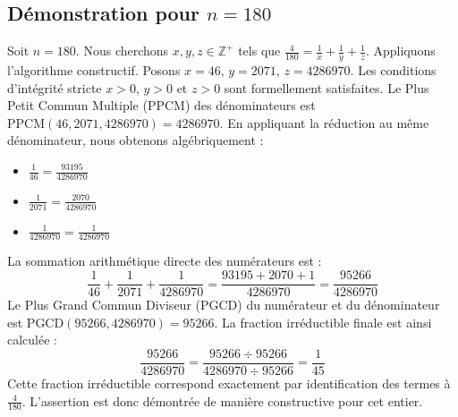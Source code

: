 \documentclass[11pt,a4paper]{article}
\begin{document}
\subsection{Démonstration pour $n = 180$}
Soit $n = 180$. Nous cherchons $x, y, z \in \mathbb{Z}^{+}$ tels que $\frac{4}{180} = \frac{1}{x} + \frac{1}{y} + \frac{1}{z}$.
Appliquons l'algorithme constructif. Posons $x = 46$, $y = 2071$, $z = 4286970$.
Les conditions d'intégrité stricte $x > 0$, $y > 0$ et $z > 0$ sont formellement satisfaites.
Le Plus Petit Commun Multiple (PPCM) des dénominateurs est $\text{PPCM}(46, 2071, 4286970) = 4286970$.
En appliquant la réduction au même dénominateur, nous obtenons algébriquement :
\begin{itemize}
    \item $\frac{1}{46} = \frac{93195}{4286970}$
    \item $\frac{1}{2071} = \frac{2070}{4286970}$
    \item $\frac{1}{4286970} = \frac{1}{4286970}$
\end{itemize}
La sommation arithmétique directe des numérateurs est :
$$ \frac{1}{46} + \frac{1}{2071} + \frac{1}{4286970} = \frac{93195 + 2070 + 1}{4286970} = \frac{95266}{4286970} $$
Le Plus Grand Commun Diviseur (PGCD) du numérateur et du dénominateur est $\text{PGCD}(95266, 4286970) = 95266$.
La fraction irréductible finale est ainsi calculée :
$$ \frac{95266}{4286970} = \frac{95266 \div 95266}{4286970 \div 95266} = \frac{1}{45} $$
Cette fraction irréductible correspond exactement par identification des termes à $\frac{4}{180}$. L'assertion est donc démontrée de manière constructive pour cet entier.
\end{document}
